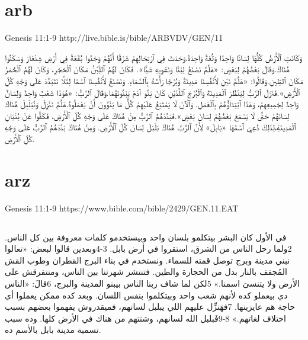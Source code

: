 \documentclass[12pt,fleqn,titlepage,twoside,a4paper]{book}
\begin{document}
\section{arb}

 Genesis 11:1-9 http://live.bible.is/bible/ARBVDV/GEN/11

\begin{arab}[utf]

وَكَانَتِ ٱلْأَرْضُ كُلُّهَا لِسَانًا وَاحِدًا وَلُغَةً وَاحِدَةً.وَحَدَثَ فِي ٱرْتِحَالِهِمْ شَرْقًا أَنَّهُمْ وَجَدُوا بُقْعَةً فِي أَرْضِ شِنْعَارَ وَسَكَنُوا هُنَاكَ.وَقَالَ بَعْضُهُمْ لِبَعْضٍ: «هَلُمَّ نَصْنَعُ لِبْنًا وَنَشْوِيهِ شَيًّا». فَكَانَ لَهُمُ ٱللِّبْنُ مَكَانَ ٱلْحَجَرِ، وَكَانَ لَهُمُ ٱلْحُمَرُ مَكَانَ ٱلطِّينِ.وَقَالُوا: «هَلُمَّ نَبْنِ لِأَنْفُسِنَا مَدِينَةً وَبُرْجًا رَأْسُهُ بِٱلسَّمَاءِ. وَنَصْنَعُ لِأَنْفُسِنَا ٱسْمًا لِئَلَّا نَتَبَدَّدَ عَلَى وَجْهِ كُلِّ ٱلْأَرْضِ».فَنَزَلَ ٱلرَّبُّ لِيَنْظُرَ ٱلْمَدِينَةَ وَٱلْبُرْجَ ٱللَّذَيْنِ كَانَ بَنُو آدَمَ يَبْنُونَهُمَا.وَقَالَ ٱلرَّبُّ: «هُوَذَا شَعْبٌ وَاحِدٌ وَلِسَانٌ وَاحِدٌ لِجَمِيعِهِمْ، وَهَذَا ٱبْتِدَاؤُهُمْ بِٱلْعَمَلِ. وَٱلْآنَ لَا يَمْتَنِعُ عَلَيْهِمْ كُلُّ مَا يَنْوُونَ أَنْ يَعْمَلُوهُ.هَلُمَّ نَنْزِلْ وَنُبَلْبِلْ هُنَاكَ لِسَانَهُمْ حَتَّى لَا يَسْمَعَ بَعْضُهُمْ لِسَانَ بَعْضٍ».فَبَدَّدَهُمُ ٱلرَّبُّ مِنْ هُنَاكَ عَلَى وَجْهِ كُلِّ ٱلْأَرْضِ، فَكَفُّوا عَنْ بُنْيَانِ ٱلْمَدِينَةِ،لِذَلِكَ دُعِيَ ٱسْمُهَا «بَابِلَ» لِأَنَّ ٱلرَّبَّ هُنَاكَ بَلْبَلَ لِسَانَ كُلِّ ٱلْأَرْضِ. وَمِنْ هُنَاكَ بَدَّدَهُمُ ٱلرَّبُّ عَلَى وَجْهِ كُلِّ ٱلْأَرْضِ.
\end{arab}

\section{arz}

 Genesis 11:1-9 https://www.bible.com/bible/2429/GEN.11.EAT

\begin{arab}[utf]

\section*{}


في الأول كان البشر بيتكلمو بلسان واحد وبيستخدمو كلمات معروفة بين كل الناس. 2ولما رحل الناس من الشرق، استقروا في أرض بابل. 3‏-4وبعدين قالوا لبعض: «تعالوا نبني مدينة وبرج توصل قمته للسماء. ونستخدم في بناء البرج القطران وطوب القش المُجفف بالنار بدل من الحجارة والطين. فتنتشر شهرتنا بين الناس، ومنتفرقش على الأرض ولا يتنسىَ اسمنا.» 5لكن لما شاف ربنا الناس بيبنو المدينة والبرج، 6قالَ: «الناس دي بيعملو كده لأنهم شعب واحد وبيتكلموا بنفس اللسان. وبعد كده ممكن يعملوا أي حاجة هم عايزينها. 7فهَنزِّل عليهم اللي يبلبل لسانهم، فميقدروش يفهموا بعضهم بسبب اختلاف لغاتهم.» 8‏-9فَبلبل الله لسانهم، وشتتهم من هناك في الأرض كلها. وده سبب تسمية مدينة بابل بالأسم ده.

\end{arab}
\end{document}
